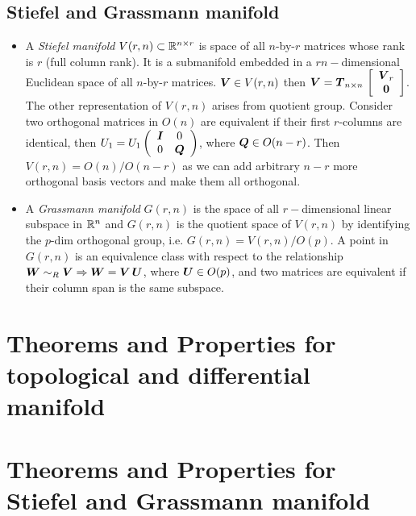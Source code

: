 \documentclass[11pt]{article}
\begin{document}
\subsection{Stiefel and Grassmann manifold}
\begin{itemize}
\item A \emph{Stiefel manifold} $V(r,n) \subset {\mathbb R}^{n\times r}$ is space of all $n$-by-$r$ matrices whose rank is $r$ (full column rank). It is a submanifold embedded in a $rn-$dimensional Euclidean space of all $n$-by-$r$ matrices. $\boldsymbol{V}\in V(r,n)$ then $\boldsymbol{V} = \boldsymbol{T}_{n\times n}\,\left[\begin{array}{c}
\boldsymbol{V}_{r}\\
\boldsymbol{0}
\end{array}\right]$.  The other representation of $V(r,n)$ arises from quotient group.  Consider two orthogonal matrices in $O(n)$ are equivalent if their first $r$-columns are identical, then $U_{1} = U_{1} \left(\begin{array}{cc}
\boldsymbol{I}&0\\
0&\boldsymbol{Q}
\end{array}\right)$, where $\boldsymbol{Q}\in O(n-r)$. Then $V(r,n) = O(n)/O(n-r)$ as we can add arbitrary $n-r$ more orthogonal basis vectors and make them all orthogonal.\\

\item A \emph{Grassmann manifold} $G(r,n)$ is the space of all $r-$dimensional linear subspace in ${\mathbb R}^{n}$ and  $G(r,n)$ is the quotient space of $V(r,n)$ by identifying the $p$-dim orthogonal group, i.e. $G(r,n) = V(r,n)/O(p)$. A point in $G(r,n)$ is an equivalence class with respect to the relationship $\boldsymbol{W} \sim_{R} \boldsymbol{V} \Rightarrow \boldsymbol{W} = \boldsymbol{V}\,\boldsymbol{U}$, where $\boldsymbol{U}\in O(p)$, and two matrices are equivalent if their column span is the same subspace.\\
\end{itemize}





\newpage
\section{Theorems and Properties for topological and differential manifold}

\newpage
\section{Theorems and Properties for Stiefel and Grassmann manifold}



\newpage


\end{document}
